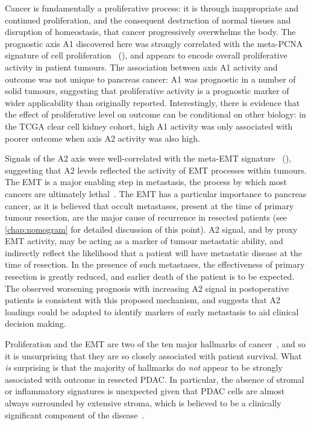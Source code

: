 \documentclass[dissertation.tex]{subfiles}
\begin{document}
Cancer is fundamentally a proliferative process: it is through inappropriate and continued proliferation, and the consequent destruction of normal tissues and disruption of homeostasis, that cancer progressively overwhelms the body.  The prognostic axis A1 discovered here was strongly correlated with the meta-PCNA signature of cell proliferation~\cite{Venet2011} (), and appears to encode overall proliferative activity in patient tumours.  The association between axis A1 activity and outcome was not unique to pancreas cancer: A1 was prognostic in a number of solid tumours, suggesting that proliferative activity is a prognostic marker of wider applicability than originally reported.  Interestingly, there is evidence that the effect of proliferative level on outcome can be conditional on other biology: in the \gls{TCGA} clear cell kidney cohort, high A1 activity was only associated with poorer outcome when axis A2 activity was also high.

Signals of the A2 axis were well-correlated with the meta-EMT signature~\cite{Groger2012} (), suggesting that A2 levels reflected the activity of \gls{EMT} processes within tumours.  The \gls{EMT} is a major enabling step in metastasis, the process by which most cancers are ultimately lethal~\cite{Talmadge2010}.  The \gls{EMT} has a particular importance to pancreas cancer, as it is believed that occult metastases, present at the time of primary tumour resection, are the major cause of recurrence in resected patients (see \cref{chap:nomogram} for detailed discussion of this point).  A2 signal, and by proxy \gls{EMT} activity, may be acting as a marker of tumour metastatic ability, and indirectly reflect the likelihood that a patient will have metastatic disease at the time of resection.  In the presence of such metastases, the effectiveness of primary resection is greatly reduced, and earlier death of the patient is to be expected.  The observed worsening prognosis with increasing A2 signal in postoperative patients is consistent with this proposed mechanism, and suggests that A2 loadings could be adapted to identify markers of early metastasis to aid clinical decision making.  

Proliferation and the \gls{EMT} are two of the ten major hallmarks of cancer~\cite{Hanahan2011}, and so it is unsurprising that they are so closely associated with patient survival.  What \emph{is} surprising is that the majority of hallmarks do \emph{not} appear to be strongly associated with outcome in resected \gls{PDAC}.  In particular, the absence of stromal or inflammatory signatures is unexpected given that \gls{PDAC} cells are almost always surrounded by extensive stroma, which is believed to be a clinically significant component of the disease~\cite{Luo2012}.
\end{document}
